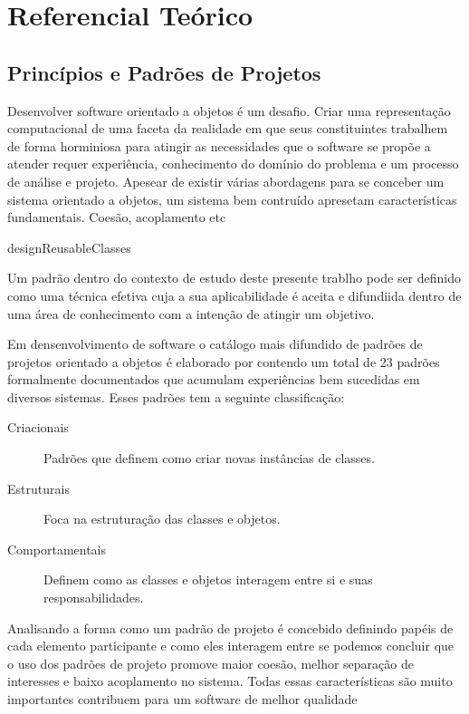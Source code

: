 \chapter{Referencial Teórico}

\section{Princípios e Padrões de Projetos}

Desenvolver software orientado a objetos é um desafio. Criar uma representação
computacional de uma faceta da realidade em que seus constituintes trabalhem de
forma horminiosa para atingir as necessidades que o software se propõe a
atender requer experiência, conhecimento do domínio do problema e um processo de
análise e projeto. Apesear de existir várias abordagens para se conceber um
sistema orientado a objetos\cite{evans2004ddd},\cite{gomma11} um sistema bem
contruído apresetam características fundamentais. Coesão, acoplamento etc


designReusableClasses

Um padrão dentro do contexto de estudo deste presente trablho pode ser definido
como uma técnica efetiva cuja a sua aplicabilidade é aceita e difundiida dentro
de uma área de conhecimento com a intenção de atingir um
objetivo\cite{MetskerWake06}.

Em densenvolvimento de software o catálogo mais difundido de padrões de projetos
orientado a objetos é elaborado por  contendo um total de 23
padrões formalmente documentados que acumulam experiências bem sucedidas em
diversos sistemas. Esses padrões tem a seguinte classificação:

\begin{description}
\item[Criacionais] Padrões que definem como criar novas instâncias de classes.
\item[Estruturais] Foca na estruturação das classes e objetos.
\item[Comportamentais] Definem como as classes e objetos interagem entre si e
suas responsabilidades.
\end{description}



Analisando a forma como um padrão de projeto é concebido definindo papéis de
cada elemento participante e como eles interagem entre se podemos concluir que
o uso dos padrões de projeto promove maior coesão, melhor separação de
interesses e baixo acoplamento no sistema. Todas essas características são muito
importantes contribuem para um software de melhor qualidade

